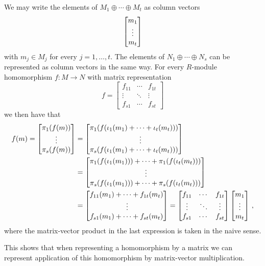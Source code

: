 \begin{fluff}
  We may write the elements of $M_1 \oplus \dotsb \oplus M_t$ as column vectors
  \[
    \begin{bmatrix}m_1 \\ \vdots \\ m_t\end{bmatrix}
  \]
  with $m_j \in M_j$ for every $j = 1, \dotsc, t$.
  The elements of $N_1 \oplus \dotsb \oplus N_s$ can be represented as column vectors in the same way.
  For every $R$-module homomorphism $f \colon M \to N$ with matrix representation
  \[
      f
    = \begin{bmatrix}
        f_{11}  & \cdots  & f_{1t}  \\
        \vdots  & \ddots  & \vdots  \\
        f_{s1}  & \cdots  & f_{st}
      \end{bmatrix}
  \]
  we then have that
  \begin{align*}
        f(m)
     =  \vect{ \pi_1(f(m)) \\ \vdots \\ \pi_s(f(m)) }
    &=  \vect{
          \pi_1( f( \iota_1(m_1) + \dotsb + \iota_t(m_t) ) )
          \\
          \phantom{\pi_1( f( \iota_1(m_1) +}
          \vdots
          \phantom{+ \iota_t(m_t) ) )}
          \\
          \pi_s( f( \iota_1(m_1) + \dotsb + \iota_t(m_t) ) )
        }
    \\
    &=  \vect{
          \pi_1(f(\iota_1(m_1))) + \dotsb + \pi_1(f(\iota_t(m_t)))
          \\
          \phantom{\pi_1(f(\iota_1(m_1))) +}
          \vdots
          \phantom{+ \pi_1(f(\iota_t(m_t)))}
          \\
          \pi_s(f(\iota_1(m_1))) + \dotsb + \pi_s(f(\iota_t(m_t)))
        }
    \\
    &=  \vect{
          f_{11}(m_1) + \dotsb + f_{1t}(m_t)
          \\
          \phantom{f_{11}(m_1) + }
          \vdots
          \phantom{ + f_{1t}(m_t)}
          \\
          f_{s1}(m_1) + \dotsb + f_{st}(m_t)
        }
    = \begin{bmatrix}
        f_{11}  & \cdots  & f_{1t}  \\
        \vdots  & \ddots  & \vdots  \\
        f_{s1}  & \cdots  & f_{st}
      \end{bmatrix}
      \vect{m_1 \\ \vdots \\ m_t} \,,
  \end{align*}
  where the matrix-vector product in the last expression is taken in the naive sense.
  
  This shows that when representing a homomorphism by a matrix we can represent application of this homomorphism by matrix-vector multiplication.
\end{fluff}


